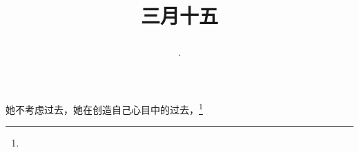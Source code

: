 \title{\date[d=23,m=4,y=2024][year:cn-y,年,month:cn,day:cn,日,·,weekday]·三月十五 }
她不考虑过去，她在创造自己心目中的过去，\footnote{ }

